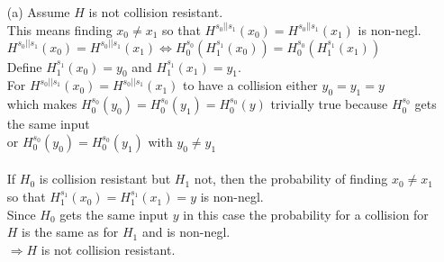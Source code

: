 \begin{itemize}
\item[(a)]
	Assume \(H\) is not collision resistant. \\
	This means finding \(x_0 \neq x_1\) so that \(H^{s_0 \vert\vert s_1}(x_0) = H^{s_0 \vert\vert s_1}(x_1)\) is non-negl. \\
	\(H^{s_0 \vert\vert s_1}(x_0) = H^{s_0 \vert\vert s_1}(x_1) \Leftrightarrow H^{s_0}_0(H^{s_1}_1(x_0)) = H^{s_0}_0(H^{s_1}_1(x_1)) \) \\
	Define \(H^{s_1}_1(x_0) = y_0\) and \(H^{s_1}_1(x_1) = y_1\). \\
	For \(H^{s_0 \vert\vert s_1}(x_0) = H^{s_0 \vert\vert s_1}(x_1)\) to have a collision either \(y_0 = y_1 = y\) \\
	which makes  \(H^{s_0}_0(y_0) = H^{s_0}_0(y_1) = H^{s_0}_0(y)\) trivially true because \(H^{s_0}_0\) gets the same input \\
	or \(H^{s_0}_0(y_0) = H^{s_0}_0(y_1)\) with \(y_0 \neq y_1\) \\
	\\
	If \(H_0\) is collision resistant but \(H_1\) not, then the probability of finding \(x_0 \neq x_1\) so that \(H^{s_1}_1(x_0) = H^{s_1}_1(x_1) = y\) is non-negl. \\
	Since \(H_0\) gets the same input \(y\) in this case the probability for a collision for \(H\) is the same as for \(H_1\) and is non-negl.\\
	\(\Rightarrow H\) is not collision resistant.\\


\end{itemize}
